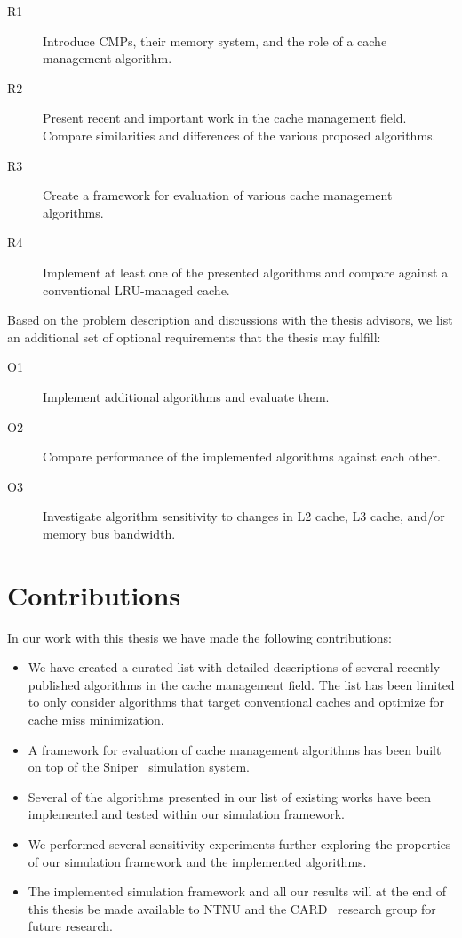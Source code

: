 \begin{description}
    \item[R1] Introduce CMPs, their memory system, and the role of a cache management algorithm.
    \item[R2] Present recent and important work in the cache management field. Compare similarities and differences of the various proposed algorithms.
    \item[R3] Create a framework for evaluation of various cache management algorithms.
    \item[R4] Implement at least one of the presented algorithms and compare against a conventional LRU-managed cache.
\end{description}
Based on the problem description and discussions with the thesis advisors, we list an additional set of optional requirements that the thesis may fulfill:

\begin{description}
    \item[O1] Implement additional algorithms and evaluate them.
    \item[O2] Compare performance of the implemented algorithms against each other.
    \item[O3] Investigate algorithm sensitivity to changes in L2 cache, L3 cache, and/or memory bus bandwidth.
\end{description}

\section{Contributions}

In our work with this thesis we have made the following contributions:

\begin{itemize}
  \item We have created a curated list with detailed descriptions of several recently published algorithms in the cache management field. The list has been limited to only consider algorithms that target conventional caches and optimize for cache miss minimization.
  \item A framework for evaluation of cache management algorithms has been built on top of the Sniper~\cite{Carlson2011a} simulation system.
  \item Several of the algorithms presented in our list of existing works have been implemented and tested within our simulation framework.
  \item We performed several sensitivity experiments further exploring the properties of our simulation framework and the implemented algorithms.
  \item The implemented simulation framework and all our results will at the end of this thesis be made available to NTNU and the CARD~\cite{CARD2015} research group for future research.
\end{itemize}

